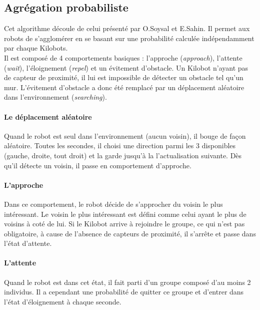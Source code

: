 \documentclass[a4paper]{article}
\begin{document}
\subsection{Agrégation probabiliste}

Cet algorithme découle de celui présenté par O.Soysal et E.Sahin. \cite{soysal_probabilistic_2005} Il permet aux robots de s'agglomérer en se basant sur une probabilité calculée indépendamment par chaque Kilobots.\\

Il est composé de 4 comportements basiques : l'approche
(\textit{approach}), l'attente
(\textit{wait}), l'éloignement 
(\textit{repel}) et un évitement d'obstacle.
Un Kilobot n'ayant pas de capteur de proximité, il lui est impossible de détecter un obstacle tel qu'un mur. L'évitement d'obstacle a donc été remplacé par un déplacement aléatoire dans l'environnement (\textit{searching}).
\paragraph{Le déplacement aléatoire} Quand le robot est seul dans l'environnement (aucun voisin), il bouge de façon aléatoire. Toutes les secondes, il choisi une direction parmi les 3 disponibles (gauche, droite, tout droit) et la garde jusqu'à la l'actualisation suivante. Dès qu'il détecte un voisin, il passe en comportement d'approche.
\paragraph{L'approche}Dans ce comportement, le robot décide de s'approcher du voisin le plus intéressant. Le voisin le plus intéressant est défini comme celui ayant le plus de voisins à coté de lui. Si le Kilobot arrive à rejoindre le groupe, ce qui n'est pas obligatoire, à cause de l'absence de capteurs de proximité, il s'arrête et passe dans l'état d'attente.
\paragraph{L'attente} Quand le robot est dans cet état, il fait parti d'un groupe composé d'au moins 2 individus. Il a cependant une probabilité de quitter ce groupe et d'entrer dans l'état d'éloignement à chaque seconde.
\end{document}
